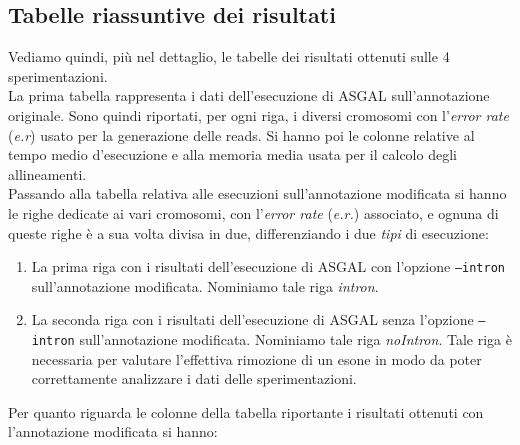 \documentclass[a4paper,12pt, oneside]{book}
\begin{document}

\subsection{Tabelle riassuntive dei risultati}
Vediamo quindi, più nel dettaglio, le tabelle dei risultati ottenuti sulle 4
sperimentazioni.\\
La prima tabella rappresenta i dati dell'esecuzione di ASGAL sull'annotazione
originale. Sono quindi riportati, per ogni riga, i diversi cromosomi con
l'\textit{error rate} (\textit{e.r}) usato per la generazione delle reads. Si
hanno poi le colonne relative al tempo medio d'esecuzione e alla memoria media
usata per il calcolo degli allineamenti.\\
Passando alla tabella relativa alle esecuzioni sull'annotazione modificata si
hanno le righe dedicate ai vari cromosomi, con l'\textit{error rate}
(\textit{e.r.}) associato, e ognuna di queste righe è a sua 
volta divisa in due, differenziando i due \textit{tipi} di esecuzione:
\begin{enumerate}
  \item La prima riga con i risultati dell'esecuzione di ASGAL con l'opzione
  \texttt{--intron} sull'annotazione modificata. Nominiamo tale riga
  \textit{intron}.
  \item La seconda riga con i risultati dell'esecuzione di ASGAL senza l'opzione
  \texttt{--intron} sull'annotazione modificata. Nominiamo tale riga
  \textit{noIntron}. Tale riga è necessaria per valutare l'effettiva rimozione di
  un esone in modo da poter correttamente analizzare i dati delle
  sperimentazioni.
\end{enumerate}
Per quanto riguarda le colonne della tabella riportante i risultati ottenuti con
l'annotazione modificata si hanno: 
\end{document}
